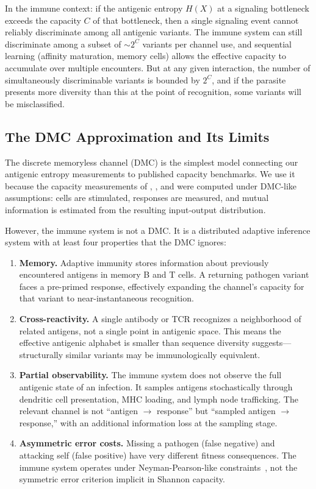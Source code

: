 \documentclass[twocolumn,10pt]{article}
\begin{document}
In the immune context: if the antigenic entropy $H(X)$ at a signaling bottleneck exceeds the capacity $C$ of that bottleneck, then a single signaling event cannot reliably discriminate among all antigenic variants.  The immune system can still discriminate among a subset of ${\sim}2^C$ variants per channel use, and sequential learning (affinity maturation, memory cells) allows the effective capacity to accumulate over multiple encounters.  But at any given interaction, the number of simultaneously discriminable variants is bounded by $2^C$, and if the parasite presents more diversity than this at the point of recognition, some variants will be misclassified.

\subsection{The DMC Approximation and Its Limits}
\label{sec:dmc}

The discrete memoryless channel (DMC) is the simplest model connecting our antigenic entropy measurements to published capacity benchmarks.  We use it because the capacity measurements of \citet{cheong2011}, \citet{selimkhanov2014}, and \citet{adelaja2021} were computed under DMC-like assumptions: cells are stimulated, responses are measured, and mutual information is estimated from the resulting input-output distribution.

However, the immune system is not a DMC.  It is a distributed adaptive inference system with at least four properties that the DMC ignores:

\begin{enumerate}
\item \textbf{Memory.}  Adaptive immunity stores information about previously encountered antigens in memory B and T cells.  A returning pathogen variant faces a pre-primed response, effectively expanding the channel's capacity for that variant to near-instantaneous recognition.

\item \textbf{Cross-reactivity.}  A single antibody or TCR recognizes a neighborhood of related antigens, not a single point in antigenic space.  This means the effective antigenic alphabet is smaller than sequence diversity suggests---structurally similar variants may be immunologically equivalent.

\item \textbf{Partial observability.}  The immune system does not observe the full antigenic state of an infection.  It samples antigens stochastically through dendritic cell presentation, MHC loading, and lymph node trafficking.  The relevant channel is not ``antigen $\to$ response'' but ``sampled antigen $\to$ response,'' with an additional information loss at the sampling stage.

\item \textbf{Asymmetric error costs.}  Missing a pathogen (false negative) and attacking self (false positive) have very different fitness consequences.  The immune system operates under Neyman-Pearson-like constraints~\citep{cover2006}, not the symmetric error criterion implicit in Shannon capacity.
\end{enumerate}
\end{document}
